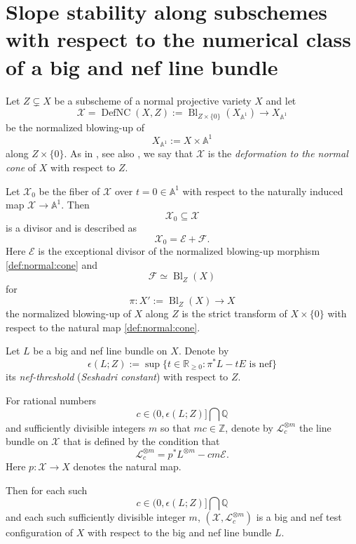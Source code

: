 \documentclass[12pt]{amsart}
\renewcommand{\geq}{\geqslant}
\renewcommand{\AA}{\mathbb{A}} %
\newcommand{\QQ}{\mathbb{Q}} %
\newcommand{\RR}{\mathbb{R}} %
\newcommand{\ZZ}{\mathbb{Z}} %
\theoremstyle{definition}
\numberwithin{equation}{section}
\begin{document}
\section{Slope stability along subschemes with respect to the numerical class of a big and nef line bundle}\label{extended:ross:thomas}

Let $Z \subsetneq X$ be a subscheme of a normal projective variety $X$ and let
\begin{equation}\label{def:normal:cone}
\mathcal{X} = \operatorname{DefNC}(X,Z) := \operatorname{Bl}_{Z \times \{0\}}(X_{\AA^1}) \rightarrow X_{\AA^1}
\end{equation}
be the normalized blowing-up of 
$$
X_{\AA^1} := X \times \AA^1
$$
along $Z \times \{0\}$.  As in \cite[Example, 2.4]{Boucksom-Hisamoto-Jonsson:2016}, see also \cite[Section 4]{Ross:Thomas:2007}, we say that $\mathcal{X}$ is the \emph{deformation to the normal cone} of $X$ with respect to $Z$.

Let $\mathcal{X}_0$ be the fiber of $\mathcal{X}$ over $t = 0 \in \AA^1$ with respect to the naturally induced map $\mathcal{X} \rightarrow \AA^1$.  Then 
$$\mathcal{X}_0 \subseteq \mathcal{X}$$ 
is a divisor and is described as 
$$\mathcal{X}_0 = \mathcal{E} + \mathcal{F} \text{.}$$  
Here $\mathcal{E}$ is the exceptional divisor of the normalized blowing-up morphism \eqref{def:normal:cone} and
$$
\mathcal{F} \simeq \operatorname{Bl}_Z(X)
$$
for
$$
\pi \colon X' :=  \operatorname{Bl}_Z(X) \rightarrow X
$$
the normalized blowing-up of $X$ along $Z$ is the strict transform of $X \times \{0\}$ with respect to the natural  map \eqref{def:normal:cone}.

Let $L$ be a big and nef line bundle on $X$.  Denote by
$$
\epsilon(L;Z) := \sup \{ t \in \RR_{\geq 0} : \pi^* L - t E \text{ is nef} \}
$$
its \emph{nef-threshold} (\emph{Seshadri constant}) with respect to $Z$.

For rational numbers 
$$c \in (0,\epsilon(L;Z)] \bigcap \QQ$$ 
and sufficiently divisible integers $m$ so that $mc \in \ZZ$, denote by $\mathcal{L}^{\otimes m}_c$ the line bundle on $\mathcal{X}$ that is defined by the condition that 
$$
\mathcal{L}_c^{\otimes m} = p^* L^{\otimes m} - c m \mathcal{E} \text{.}
$$
Here 
$p \colon \mathcal{X} \rightarrow X$
denotes the natural map.

Then for each such 
$$c \in (0,\epsilon(L;Z)] \bigcap \QQ$$ 
and each such sufficiently divisible integer $m$, $(\mathcal{X},\mathcal{L}_c^{\otimes m})$ is a big and nef test configuration of $X$ with respect to the big and nef line bundle $L$.
\end{document}
